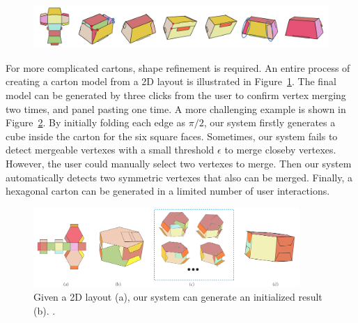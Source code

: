 
\begin{figure}
	\centering
	\includegraphics[width=\textwidth]{images/105}
	\caption{}
	\label{fig:result}
\end{figure}

For more complicated cartons, shape refinement is required. 
An entire process of creating a carton model from a 2D layout is illustrated in Figure~\ref{fig:result}.
%
The final model can be generated by three clicks from the user to confirm vertex merging two times, and panel pasting one time.
%
A more challenging example is shown in Figure~\ref{fig:hexagon}. 
By initially folding each edge as $\pi/2$, our system firstly generates a cube inside the carton for the six square faces. 
Sometimes, our system fails to detect mergeable vertexes with a small threshold $\epsilon$ to merge closeby vertexes.
%
However, the user could manually select two vertexes to merge. Then our system automatically detects two symmetric vertexes that also can be merged. 
%
Finally, a hexagonal carton can be generated in a limited number of user interactions.
%



%





\begin{figure}
	\centering
	\includegraphics[width=0.9\textwidth]{images/limitation}
	\caption{Given a 2D layout (a), our system can generate an initialized result (b). . }
	\label{fig:hexagon}
\end{figure}


